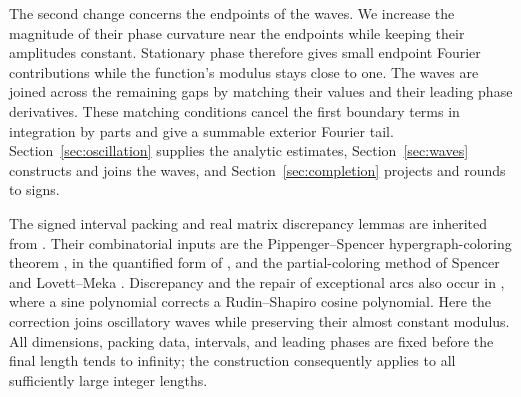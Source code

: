 The second change concerns the endpoints of the waves. We increase the
magnitude of their phase curvature near the endpoints while keeping
their amplitudes constant. Stationary phase
therefore gives small endpoint Fourier contributions while the
function's modulus stays close to one. The waves are joined across
the remaining gaps by matching their values and their leading phase
derivatives. These matching conditions cancel the first boundary terms
in integration by parts and give a summable exterior Fourier tail.
Section~\ref{sec:oscillation} supplies the analytic estimates,
Section~\ref{sec:waves} constructs and joins the waves, and
Section~\ref{sec:completion} projects and rounds to signs.

The signed interval packing and real matrix discrepancy lemmas are
inherited from \cite[Lemmas~3.1 and~6.2]{OpenAILowerEnvelope2026}.
Their combinatorial inputs are the Pippenger--Spencer hypergraph-coloring
theorem \cite{PippengerSpencer1989}, in the quantified form of
\cite[Lemma~2.1]{AlonYuster2005}, and the partial-coloring method of
Spencer \cite{Spencer1985} and Lovett--Meka \cite{LovettMeka2015}.
Discrepancy and the repair of exceptional arcs also occur in
\cite[Sections~2.1 and~4]{BalisterEtAl2020}, where a sine polynomial
corrects a Rudin--Shapiro cosine polynomial. Here the correction joins
oscillatory waves while preserving their almost constant modulus.
All dimensions, packing data, intervals, and leading phases are fixed before
the final length tends to infinity; the construction consequently
applies to all sufficiently large integer lengths.

